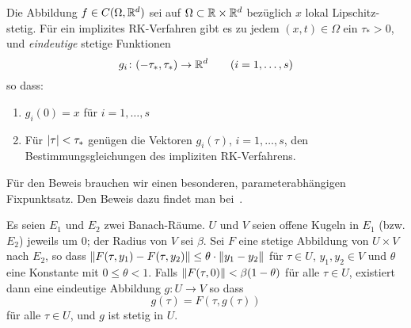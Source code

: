 \begin{satz}
\label{eq:wellposedness_of_implicit_rk_methods}
	Die Abbildung $f \in C(\Omega, \mathbb R^d)$ sei auf $\Omega \subset \mathbb R \times \mathbb R^d$ bezüglich $x$ lokal Lipschitz-stetig. Für ein implizites RK-Verfahren gibt es zu jedem $(x,t) \in \Omega$ ein $\tau_\ast > 0$, und \textit{eindeutige} stetige Funktionen
	\begin{equation*}
		g_i \colon (-\tau_\ast, \tau_\ast) \to \mathbb R^d \qquad (i=1,\dots,s)
	\end{equation*} 
	so dass:
	\begin{enumerate}
		\item $g_i(0) = x$ für $i=1,\dots, s$
		\item Für $\lvert \tau \rvert < \tau_\ast$ genügen die Vektoren $g_i(\tau)$, $i=1,\dots,s$, den Bestimmungsgleichungen des impliziten RK-Verfahrens.
	\end{enumerate}
\end{satz} 

Für den Beweis brauchen wir einen besonderen, parameterabhängigen Fixpunktsatz.
Den Beweis dazu findet man bei~\cite[Satz~10.1.1]{dieudonne:1960}.

\begin{satz}
\label{thm:parameter_fixed_point}
	Es seien $E_1$ und $E_2$ zwei Banach-Räume. $U$ und $V$ seien offene Kugeln in $E_1$ (bzw. $E_2$) jeweils um $0$; der Radius von $V$ sei $\beta$.
	Sei $F$ eine stetige Abbildung von $U \times V$ nach $E_2$, so dass
	$\lVert F(\tau,y_1) - F(\tau,y_2) \rVert \le \theta \cdot \lVert y_1 - y_2 \rVert$
	für $\tau \in U$, $y_1, y_2 \in V$ und $\theta$ eine Konstante mit $0 \le \theta < 1$.
	Falls $\lVert F(\tau,0) \rVert < \beta (1-\theta)$ für alle $\tau \in U$, existiert
	dann eine eindeutige Abbildung $g : U \to V$ so dass
	\begin{equation*}
		g(\tau) = F(\tau,g(\tau))
	\end{equation*}
	für alle $\tau \in U$, und $g$ ist stetig in $U$.
\end{satz}


